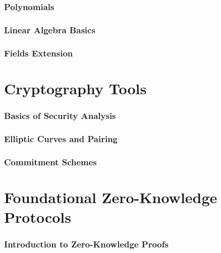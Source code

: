 \documentclass{zkdl-template}
\begin{document}
    \section{Polynomials}\label{section:polynomial-rings}
    

    \section{Linear Algebra Basics}\label{section:linear-algebra}
    

    \section{Fields Extension}\label{section:finite-fields}
    


    \part{Cryptography Tools}
    

    \section{Basics of Security Analysis}\label{section:security-analysis}
    

    \section{Elliptic Curves and Pairing}\label{section:elliptic-curves}
    

    \section{Commitment Schemes}\label{section:commitment-schemes}
    


    \part{Foundational Zero-Knowledge Protocols}
    

    \section{Introduction to Zero-Knowledge Proofs}\label{section:intro-zk}
    
\end{document}

